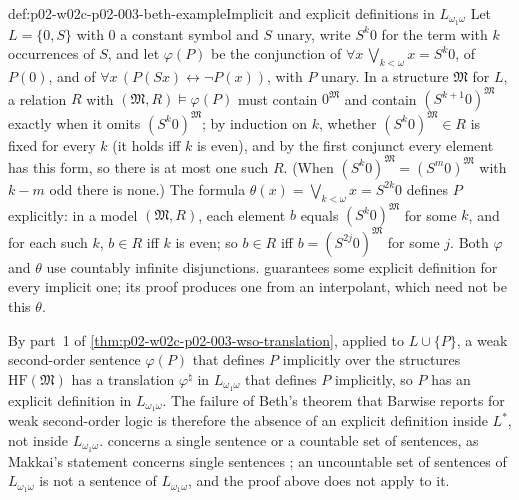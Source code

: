 \begin{hbexample}{def:p02-w02c-p02-003-beth-example}{Implicit and explicit definitions in \(L_{\omega_1\omega}\)}
Let \(L=\{0,S\}\) with \(0\) a constant symbol and \(S\) unary, write
\(S^{k}0\) for the term with \(k\) occurrences of \(S\), and let
\(\varphi(P)\) be the conjunction of
\(\forall x\,\bigvee_{k<\omega}x=S^{k}0\), of \(P(0)\), and of
\(\forall x\,(P(Sx)\leftrightarrow\neg P(x))\), with \(P\) unary.  In a
structure \(\mathfrak M\) for \(L\), a relation \(R\) with
\((\mathfrak M,R)\models\varphi(P)\) must contain \(0^{\mathfrak M}\) and
contain \((S^{k+1}0)^{\mathfrak M}\) exactly when it omits
\((S^{k}0)^{\mathfrak M}\); by induction on \(k\), whether
\((S^{k}0)^{\mathfrak M}\in R\) is fixed for every \(k\) (it holds iff
\(k\) is even), and by the first conjunct every element has this form, so
there is at most one such \(R\).  (When
\((S^{k}0)^{\mathfrak M}=(S^{m}0)^{\mathfrak M}\) with \(k-m\) odd there is
none.)  The formula \(\theta(x)=\bigvee_{k<\omega}x=S^{2k}0\) defines \(P\)
explicitly: in a model \((\mathfrak M,R)\), each element \(b\) equals
\((S^{k}0)^{\mathfrak M}\) for some \(k\), and for each such \(k\),
\(b\in R\) iff \(k\) is even; so \(b\in R\) iff \(b=(S^{2j}0)^{\mathfrak M}\)
for some \(j\).  Both \(\varphi\) and \(\theta\) use countably infinite
disjunctions.
 guarantees some explicit definition for
every implicit one; its proof produces one from an interpolant, which need
not be this \(\theta\).
\end{hbexample}

By part~1 of \cref{thm:p02-w02c-p02-003-wso-translation}, applied to
\(L\cup\{P\}\), a weak second-order sentence \(\varphi(P)\) that defines
\(P\) implicitly over the structures \(\mathrm{HF}(\mathfrak M)\) has a
translation \(\varphi^{\natural}\) in \(L_{\omega_1\omega}\) that defines
\(P\) implicitly, so \(P\) has an explicit definition in
\(L_{\omega_1\omega}\).  The failure of Beth's theorem that Barwise reports
for weak second-order logic is therefore the absence of an explicit
definition inside \(L^{*}\), not inside \(L_{\omega_1\omega}\).
 concerns a single sentence or a countable
set of sentences, as Makkai's statement concerns single sentences
\cite[ch.~A.7, \S1, p.~236]{Makkai1977}; an uncountable set of sentences of
\(L_{\omega_1\omega}\) is not a sentence of \(L_{\omega_1\omega}\), and the
proof above does not apply to it.

